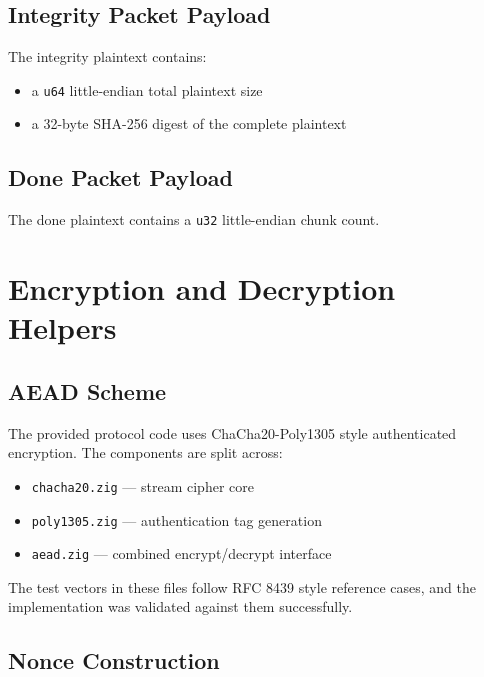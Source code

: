 \documentclass[11pt,a4paper]{report}
\begin{document}
\section{Integrity Packet Payload}

The integrity plaintext contains:

\begin{itemize}[leftmargin=1.5cm]
    \item a \texttt{u64} little-endian total plaintext size
    \item a 32-byte SHA-256 digest of the complete plaintext
\end{itemize}

\section{Done Packet Payload}

The done plaintext contains a \texttt{u32} little-endian chunk count.

\chapter{Encryption and Decryption Helpers}

\section{AEAD Scheme}

The provided protocol code uses ChaCha20-Poly1305 style authenticated encryption. The components are split across:

\begin{itemize}[leftmargin=1.5cm]
    \item \texttt{chacha20.zig} --- stream cipher core
    \item \texttt{poly1305.zig} --- authentication tag generation
    \item \texttt{aead.zig} --- combined encrypt/decrypt interface
\end{itemize}

The test vectors in these files follow RFC 8439 style reference cases, and the implementation was validated against them successfully.

\section{Nonce Construction}
\end{document}
